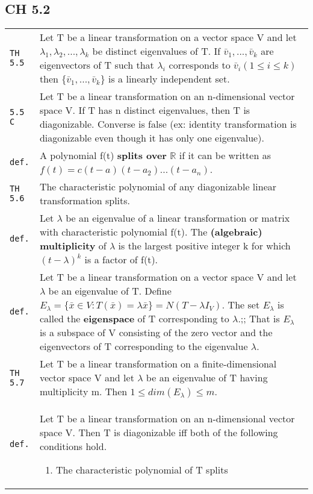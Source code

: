 \documentclass[10pt,landscape]{article}
\begin{document}
\begin{multicols}{3}
\section{CH 5.2}
\begin{tabular}{@{}p{\the\MyLen}%
                @{}p{\linewidth-\the\MyLen}@{}} %
\verb!TH 5.5! & Let T be a linear transformation on a vector space V and let $\lambda_1 , \lambda_2 ,..., \lambda_k$ be distinct eigenvalues of T. If $\bar{v}_1 ,..., \bar{v}_k$ are
               eigenvectors of T such that $\lambda_i$ corresponds to $\bar{v}_i (1\leq i\leq k)$ then $\{\bar{v}_1 ,...,\bar{v}_k \}$ is a linearly independent set.\\
\verb!5.5 C! & Let T be a linear transformation on an n-dimensional vector space V. If T has n distinct eigenvalues, then T is diagonizable. Converse is false (ex: identity transformation
              is diagonizable even though it has only one eigenvalue).\\
\verb!def.! & A polynomial f(t) \textbf{splits over} $\mathbb{R}$ if it can be written as $f(t) = c(t - a)(t - a_2)...(t - a_n)$.\\
\verb!TH 5.6! & The characteristic polynomial of any diagonizable linear transformation splits.\\
\verb!def.! & Let $\lambda$ be an eigenvalue of a linear transformation or matrix with characteristic polynomial f(t). The \textbf{(algebraic) multiplicity} of $\lambda$ is the largest
             positive integer k for which $(t - \lambda)^k$ is a factor of f(t).\\
\verb!def.! & Let T be a linear transformation on a vector space V and let $\lambda$ be an eigenvalue of T. Define $E_\lambda = \{\bar{x}\in V:T(\bar{x}) = \lambda\bar{x}\} = N(T - \lambda
             I_V)$. The set $E_\lambda$ is called the \textbf{eigenspace} of T corresponding to $\lambda$.;; That is $E_\lambda$ is a subspace of V consisting of the zero vector and the
             eigenvectors of T corresponding to the eigenvalue $\lambda$.\\
\verb!TH 5.7! & Let T be a linear transformation on a finite-dimensional vector space V and let $\lambda$ be an eigenvalue of T having multiplicity m. Then $1\leq dim(E_\lambda)\leq m$.\\
\verb!def.! & Let T be a linear transformation on an n-dimensional vector space V. Then T is diagonizable iff both of the following conditions hold.
             \begin{enumerate}
               \item The characteristic polynomial of T splits

\end{enumerate}
\end{tabular}
\end{multicols}
\end{document}
